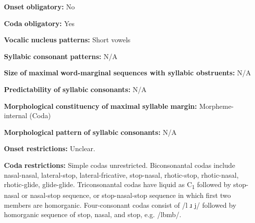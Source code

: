 \documentclass[output=paper]{langsci/langscibook}
\begin{document}
\begin{styleBody}
\textbf{Onset} \textbf{obligatory:} No
\end{styleBody}

\begin{styleBody}
\textbf{Coda} \textbf{obligatory:} Yes
\end{styleBody}

\begin{styleBody}
\textbf{Vocalic} \textbf{nucleus} \textbf{patterns:} Short vowels
\end{styleBody}

\begin{styleBody}
\textbf{Syllabic} \textbf{consonant} \textbf{patterns:} N/A
\end{styleBody}

\begin{styleBody}
\textbf{Size} \textbf{of} \textbf{maximal} \textbf{word{}-marginal sequences with syllabic obstruents:} N/A
\end{styleBody}

\begin{styleBody}
\textbf{Predictability} \textbf{of} \textbf{syllabic} \textbf{consonants:} N/A
\end{styleBody}

\begin{styleBody}
\textbf{Morphological} \textbf{constituency} \textbf{of} \textbf{maximal} \textbf{syllable} \textbf{margin:} Morpheme-internal (Coda)
\end{styleBody}

\begin{styleBody}
\textbf{Morphological} \textbf{pattern} \textbf{of} \textbf{syllabic} \textbf{consonants:} N/A
\end{styleBody}

\begin{styleBody}
\textbf{Onset} \textbf{restrictions:} Unclear.
\end{styleBody}

\begin{styleBody}
\textbf{Coda} \textbf{restrictions:} Simple codas unrestricted. Biconsonantal codas include nasal-nasal, lateral-stop, lateral-fricative, stop-nasal, rhotic-stop, rhotic-nasal, rhotic-glide, glide-glide. Triconsonantal codas have liquid as C\textsubscript{1} followed by stop-nasal or nasal-stop sequence, or stop-nasal-stop sequence in which first two members are homorganic. Four-consonant codas consist of /l ɹ j/ followed by homorganic sequence of stop, nasal, and stop, e.g. /lbmb/.
\end{styleBody}
\end{document}
